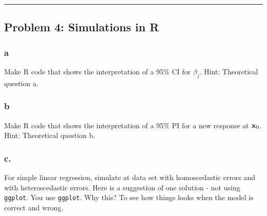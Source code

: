 \documentclass[]{article}
\begin{document}
\begin{center}\rule{0.5\linewidth}{\linethickness}\end{center}

\subsection{Problem 4: Simulations in
R}\label{problem-4-simulations-in-r}

\subsubsection{a}\label{a-2}

Make R code that shows the interpretation of a 95\% CI for \(\beta_j\).
Hint: Theoretical question a.

\subsubsection{b}\label{b-2}

Make R code that shows the interpretation of a 95\% PI for a new
response at \({\bf x}_0\). Hint: Theoretical question b.

\subsubsection{c.}\label{c.}

For simple linear regression, simulate at data set with homoscedastic
errors and with heteroscedastic errors. Here is a suggestion of one
solution - not using \texttt{ggplot}. You use \texttt{ggplot}. Why this?
To see how things looks when the model is correct and wrong.
\end{document}

